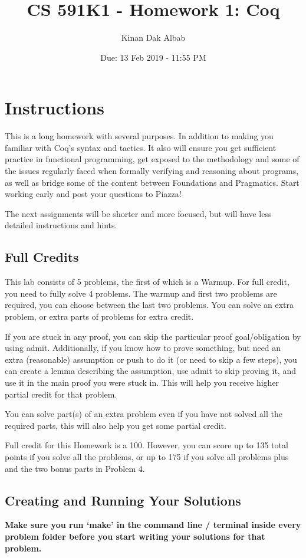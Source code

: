 \documentclass{article}
\title{CS 591K1 - Homework 1: Coq}
\author{Kinan Dak Albab}
\date{Due: 13 Feb 2019 - 11:55 PM}
\begin{document}
\maketitle

\section*{Instructions}
This is a long homework with several purposes. In addition to making you familiar with Coq's syntax and tactics.
It also will ensure you get sufficient practice in functional programming, get exposed to the methodology and some
of the issues regularly faced when formally verifying and reasoning about programs, as well as bridge some of the
content between Foundations and Pragmatics. Start working early and post your questions to Piazza!

The next assignments will be shorter and more focused, but will have less detailed instructions
and hints.

\subsection*{Full Credits}
This lab consists of 5 problems, the first of which is a Warmup. 
For full credit, you need to fully solve 4 problems. The warmup and first two problems
are required, you can choose between the last two problems. You can solve an extra problem, or
extra parts of problems for extra credit.

If you are stuck in any proof, you can skip the particular proof goal/obligation by using admit.
Additionally, if you know how to prove something, but need an extra (reasonable) assumption or push
to do it (or need to skip a few steps), you can create a lemma describing the assumption, use admit
to skip proving it, and use it in the main proof you were stuck in. This will help
you receive higher partial credit for that problem.

You can solve part(s) of an extra problem even if you have not solved all the required parts, this will
also help you get some partial credit.

Full credit for this Homework is a 100. However, you can score up to 135 total points if you solve all the
problems, or up to 175 if you solve all problems plus and the two bonus parts in Problem 4.

\subsection*{Creating and Running Your Solutions}
\textbf{Make sure you run `make' in the command line / terminal inside every problem folder before you
start writing your solutions for that problem.}\\
\end{document}
